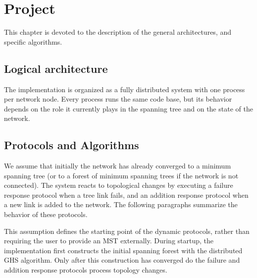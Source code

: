 \newcommand{\msg}[1]{\textsc{#1}\xspace}

\chapter{Project}\label{ch:project}

This chapter is devoted to the description of the general architectures, and specific algorithms.

\section{Logical architecture}

The implementation is organized as a fully distributed system with one process per network node. Every process runs the same code base, but its behavior depends on the role it currently plays in the spanning tree and on the state of the network.

\section{Protocols and Algorithms}

We assume that initially the network has already converged to a minimum spanning tree (or
to a forest of minimum spanning trees if the network is not connected). The system reacts
to topological changes by executing a failure response protocol when a tree link fails,
and an addition response protocol when a new link is added to the network. The following
paragraphs summarize the behavior of these protocols.

This assumption defines the starting point of the dynamic protocols, rather than requiring
the user to provide an MST externally. During startup, the implementation first constructs
the initial spanning forest with the distributed GHS algorithm. Only after this
construction has converged do the failure and addition response protocols process topology
changes.


